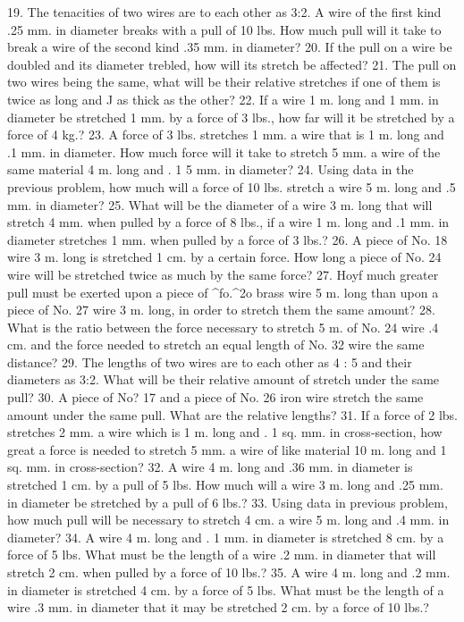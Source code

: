 19. The tenacities of two wires are to each other as 3:2. A wire of the first kind .25 mm. in diameter breaks with a pull of 10 lbs. How much pull will it take to break a wire of the second kind .35 mm. in diameter?
20. If the pull on a wire be doubled and its diameter trebled, how will its stretch be affected?
21. The pull on two wires being the same, what will be their relative stretches if one of them is twice as long and J as thick as the other?
22. If a wire 1 m. long and 1 mm. in diameter be stretched 1 mm. by a force of 3 lbs., how far will it be stretched by a force of 4 kg.?
23. A force of 3 lbs. stretches 1 mm. a wire that is 1 m. long and .1 mm. in diameter. How much force will it take to stretch 5 mm. a wire of the same material 4 m. long and . 1 5 mm. in diameter?
24. Using data in the previous problem, how much will a force of 10 lbs. stretch a wire 5 m. long and .5 mm. in diameter?
25. What will be the diameter of a wire 3 m. long that will stretch 4 mm. when pulled by a force of 8 lbs., if a wire 1 m. long and .1 mm. in diameter stretches 1 mm. when pulled by a force of 3 lbs.?
26. A piece of No. 18 wire 3 m. long is stretched 1 cm. by a certain force. How long a piece of No. 24 wire will be stretched twice as much by the same force?
27. Hoyf much greater pull must be exerted upon a piece of ^fo.^2o brass wire 5 m. long than upon a piece of No. 27 wire 3 m. long, in order to stretch them the same amount?
28. What is the ratio between the force necessary to stretch 5 m. of No. 24 wire .4 cm. and the force needed to stretch an equal length of No. 32 wire the same distance?
29. The lengths of two wires are to each other as 4 : 5 and their diameters as 3:2. What will be their relative amount of stretch under the same pull?
30. A piece of No? 17 and a piece of No. 26 iron wire stretch the same amount under the same pull. What are the relative lengths?
31. If a force of 2 lbs. stretches 2 mm. a wire which is 1 m. long and . 1 sq. mm. in cross-section, how great a force is needed to stretch 5 mm. a wire of like material 10 m. long and 1 sq. mm. in cross-section?
32. A wire 4 m. long and .36 mm. in diameter is stretched 1 cm. by a pull of 5 lbs. How much will a wire 3 m. long and .25 mm. in diameter be stretched by a pull of 6 lbs.?
33. Using data in previous problem, how much pull will be necessary to stretch 4 cm. a wire 5 m. long and .4 mm. in diameter?
34. A wire 4 m. long and . 1 mm. in diameter is stretched 8 cm. by a force of 5 lbs. What must be the length of a wire .2 mm. in diameter that will stretch 2 cm. when pulled by a force of 10 lbs.?
35. A wire 4 m. long and .2 mm. in diameter is stretched 4 cm. by a force of 5 lbs. What must be the length of a wire .3 mm. in diameter that it may be stretched 2 cm. by a force of 10 lbs.?

